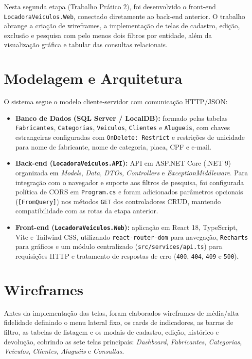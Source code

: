 \documentclass[12pt]{article}
\begin{document}
Nesta segunda etapa (Trabalho Prático 2), foi desenvolvido o front-end \texttt{LocadoraVeiculos.Web}, conectado diretamente ao back-end anterior. O trabalho abrange a criação de wireframes, a implementação de telas de cadastro, edição, exclusão e pesquisa com pelo menos dois filtros por entidade, além da visualização gráfica e tabular das consultas relacionais.

\section{Modelagem e Arquitetura}

O sistema segue o modelo cliente-servidor com comunicação HTTP/JSON:

\begin{itemize}
  \item \textbf{Banco de Dados (SQL Server / LocalDB):} formado pelas tabelas \texttt{Fabricantes}, \texttt{Categorias}, \texttt{Veiculos}, \texttt{Clientes} e \texttt{Alugueis}, com chaves estrangeiras configuradas com \texttt{OnDelete: Restrict} e restrições de unicidade para nome de fabricante, nome de categoria, placa, CPF e e-mail.
  \item \textbf{Back-end (\texttt{LocadoraVeiculos.API}):} API em ASP.NET Core (.NET 9) organizada em \textit{Models}, \textit{Data}, \textit{DTOs}, \textit{Controllers} e \textit{ExceptionMiddleware}. Para integração com o navegador e suporte aos filtros de pesquisa, foi configurada política de CORS em \texttt{Program.cs} e foram adicionados parâmetros opcionais (\texttt{[FromQuery]}) nos métodos \texttt{GET} dos controladores CRUD, mantendo compatibilidade com as rotas da etapa anterior.
  \item \textbf{Front-end (\texttt{LocadoraVeiculos.Web}):} aplicação em React 18, TypeScript, Vite e Tailwind CSS, utilizando \texttt{react-router-dom} para navegação, \texttt{Recharts} para gráficos e um módulo centralizado (\texttt{src/services/api.ts}) para requisições HTTP e tratamento de respostas de erro (\texttt{400}, \texttt{404}, \texttt{409} e \texttt{500}).
\end{itemize}

\section{Wireframes}

Antes da implementação das telas, foram elaborados wireframes de média/alta fidelidade definindo o menu lateral fixo, os cards de indicadores, as barras de filtro, as tabelas de listagem e os modais de cadastro, edição, histórico e devolução, cobrindo as sete telas principais: \textit{Dashboard}, \textit{Fabricantes}, \textit{Categorias}, \textit{Veículos}, \textit{Clientes}, \textit{Aluguéis} e \textit{Consultas}.
\end{document}
